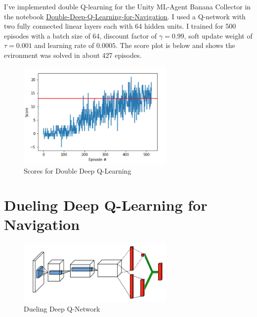 \documentclass[tog]{acmsiggraph}
\begin{document}
I've implemented double Q-learning for the Unity ML-Agent Banana Collector in the notebook 
\href{https://nbviewer.jupyter.org/github/bobflagg/Deep-Q-Learning-for-Navigation/blob/master/02-Double-Deep-Q-Learning-for-Navigation.ipynb}{\underline{Double-Deep-Q-Learning-for-Navigation}}.
I used a Q-network with two fully connected linear layers each with 64 hidden units.   I trained for 500 episodes with a batch size of 64, discount factor of $\gamma = 0.99$, soft update weight of $\tau = 0.001$ and learning rate of $0.0005$.  The score plot is below and shows the evironment was solved in about 427 episodes.

\begin{figure}[h]
	\centering
	\includegraphics[width=3.0in]{images/double-dqn-scores}
	\caption{Scores for Double Deep Q-Learning}
	\label{fig:ferrari}
\end{figure}

\section{ Dueling Deep Q-Learning for Navigation}

\begin{figure}[h]
	\centering
	\includegraphics[width=3.0in]{images/dueling-dqn}
	\caption{Dueling Deep Q-Network~\protect\cite{DBLP:journals/corr/WangFL15}}
	\label{fig:dueling-dq}
\end{figure}
\end{document}
